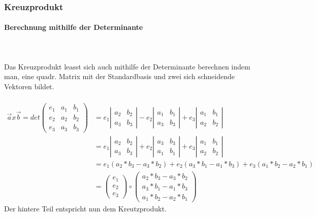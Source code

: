 \documentclass[a4paper]{article} %
\begin{document}
	\subsubsection{Kreuzprodukt}
	\paragraph{Berechnung mithilfe der Determinante}
	\hspace{0 cm} \\ \noindent \\
	Das Kreuzprodukt leasst sich auch mithilfe der Determinante berechnen indem man, eine quadr. Matrix mit der Standardbasis und zwei sich schneidende Vektoren
	bildet.\\\\
	$\begin{array}{cc}
	\vec{a} x \vec{b}=det\begin{pmatrix} e_1 & a_1 & b_1 \\ e_2 & a_2 & b_2  \\ e_3 & a_3 & b_3  \end{pmatrix}
	&= e_1\left|\begin{array}{cc} a_2 & b_2 \\ a_3 & b_3\end{array} \right|-e_2\left|\begin{array}{cc} a_1 & b_1 \\ a_3 & b_3\end{array} \right|+e_3\left|\begin{array}{cc} a_1 & b_1 \\ a_2 & b_2\end{array} \right|\\
	&= e_1\left|\begin{array}{cc} a_2 & b_2 \\ a_3 & b_3\end{array} \right|+e_2\left|\begin{array}{cc} a_3 & b_3 \\ a_1 & b_1\end{array} \right|+e_3\left|\begin{array}{cc} a_1 & b_1 \\ a_2 & b_2\end{array} \right|\\
	&= e_1(a_2*b_3-a_3*b_2)+e_2(a_3*b_1-a_1*b_3)+e_3(a_1*b_2-a_2*b_1)\\
	&=\begin{pmatrix} e_1 \\ e_2 \\ e_3 \end{pmatrix} \circ \begin{pmatrix} a_2*b_3-a_3*b_2 \\ a_3*b_1-a_1*b_3 \\ a_1*b_2-a_2*b_1 \end{pmatrix}
	\end{array}$
	\\Der hintere Teil entspricht nun dem Kreutzprodukt.
\end{document}
